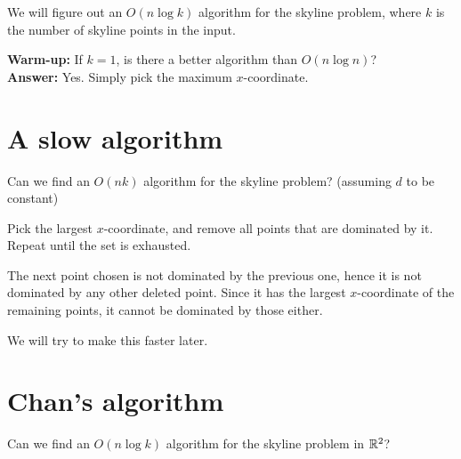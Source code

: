 
We will figure out an $O(n \log k)$ algorithm for the skyline problem,
where $k$ is the number of skyline points in the input.

\textbf{Warm-up:} If $k = 1$, is there a better algorithm than $O(n \log n)$? \\
\textbf{Answer:} Yes. Simply pick the maximum $x$-coordinate.

\section{A slow algorithm} \label{sec:slow}
\begin{question*}
    Can we find an $O(n k)$ algorithm for the skyline problem?
    (assuming $d$ to be constant)
\end{question*}
\begin{solution}
    Pick the largest $x$-coordinate,
    and remove all points that are dominated by it.
    Repeat until the set is exhausted.

    The next point chosen is not dominated by the previous one,
    hence it is not dominated by any other deleted point.
    Since it has the largest $x$-coordinate of the remaining points,
    it cannot be dominated by those either.
\end{solution}
We will try to make this faster later.

\section{Chan's algorithm} \label{sec:chan}
\begin{question*}
    Can we find an $O(n \log k)$ algorithm for the skyline problem in
    $\mathbb{R}^2$?
\end{question*}

